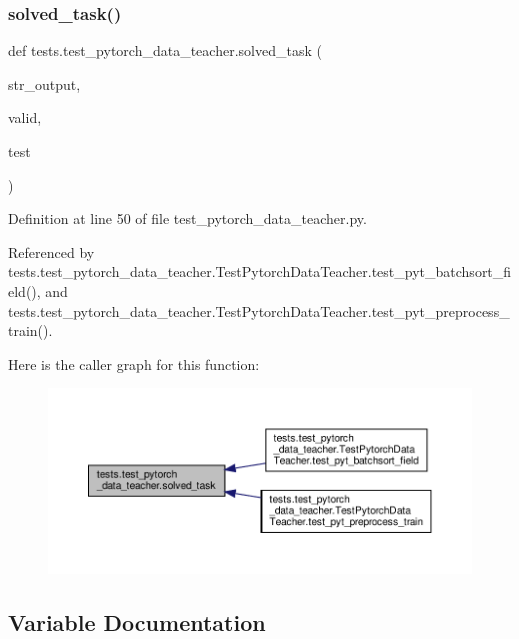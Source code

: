 \subsubsection{\texorpdfstring{solved\+\_\+task()}{solved\_task()}}
{\footnotesize\ttfamily def tests.\+test\+\_\+pytorch\+\_\+data\+\_\+teacher.\+solved\+\_\+task (\begin{DoxyParamCaption}\item[{}]{str\+\_\+output,  }\item[{}]{valid,  }\item[{}]{test }\end{DoxyParamCaption})}



Definition at line 50 of file test\+\_\+pytorch\+\_\+data\+\_\+teacher.\+py.



Referenced by tests.\+test\+\_\+pytorch\+\_\+data\+\_\+teacher.\+Test\+Pytorch\+Data\+Teacher.\+test\+\_\+pyt\+\_\+batchsort\+\_\+field(), and tests.\+test\+\_\+pytorch\+\_\+data\+\_\+teacher.\+Test\+Pytorch\+Data\+Teacher.\+test\+\_\+pyt\+\_\+preprocess\+\_\+train().

Here is the caller graph for this function\+:
\nopagebreak
\begin{figure}[H]
\begin{center}
\leavevmode
\includegraphics[width=350pt]{namespacetests_1_1test__pytorch__data__teacher_a5511223c74b5eca00f42d68488ea101e_icgraph}
\end{center}
\end{figure}


\subsection{Variable Documentation}
\mbox{\label{namespacetests_1_1test__pytorch__data__teacher_a67fc6778f807763cafa81fc964510567}} 
